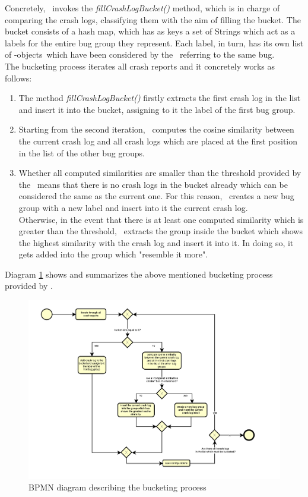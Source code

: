 Concretely, \toolname\ invokes the \textit{fillCrashLogBucket()} method, which is in charge of comparing the crash logs, classifying them with the aim of filling the bucket. 
The bucket consists of a hash map, which has as keys a set of Strings which act as a labels for the entire bug group they represent. Each label, in turn, has its own list of \Crash-objects\, which have been considered by the \Oracle\ referring to the same bug.  \\
The bucketing process iterates all crash reports and it concretely works as follows: 
\begin{enumerate}
\item The method \textit{fillCrashLogBucket()} firstly extracts the first crash log in the list and insert it into the bucket, assigning to it the label of the first bug group. 
\item Starting from the second iteration, \toolname\ computes the cosine similarity between the current crash log and all crash logs which are placed at the first position in the list of the other bug groups. 
\item Whether all computed similarities are smaller than the threshold provided by the \Oracle\, means that there is no crash logs in the bucket already which can be considered the same as the current one. For this reason, \toolname\ creates a new bug group with a new label and insert into it the current crash log. \\
Otherwise, in the event that there is at least one computed similarity which is greater than the threshold, \toolname\ extracts the group inside the bucket which shows the highest similarity with the crash log and insert it into it.
In doing so, it gets added into the group which "resemble it more". 
\end{enumerate}
Diagram \ref{bucketing} shows and summarizes the above mentioned bucketing process provided by \toolname. \\

\begin{figure}[tb]
\centering 
\includegraphics[width=\columnwidth]{diagrams/bucketingprocess.pdf} 
\caption{BPMN diagram describing the bucketing process}
\label{bucketing}
\end{figure}

